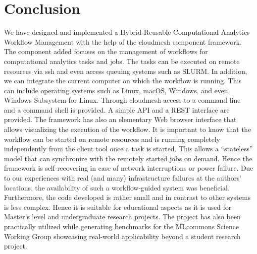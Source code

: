 
\section{Conclusion}

We have designed and implemented a Hybrid Reusable Computational
Analytics Workflow Management with the help of the cloudmesh
component framework. The component added focuses on the management of
workflows for computational analytics tasks and jobs. The tasks can be
executed on remote resources via ssh and even access queuing systems
such as SLURM. In addition, we can integrate the current computer on
which the workflow is running. This can include operating systems such
as Linux, macOS, Windows, and even Windows Subsystem for Linux. Through
cloudmesh access to a command line and a command shell is provided. A
simple API and a REST interface are provided. The framework has also an
elementary Web browser interface that allows visualizing the
execution of the workflow.  It is important to know that the workflow
can be started on remote resources and is running completely
independently from the client tool once a task is started. This allows a
``stateless'' model that can synchronize with the remotely started jobs
on demand. Hence the framework is self-recovering in case of network
interruptions or power failure. Due to our experiences with real (and
many) infrastructure failures at the authors' locations, the
availability of such a workflow-guided system was
beneficial. Furthermore, the code developed is rather small and in
contrast to other systems is less complex. Hence it is suitable for
educational aspects as it is used for Master's level and undergraduate
research projects. The project has also been practically utilized while
generating benchmarks for the MLcommons Science Working Group
showcasing real-world applicability beyond a student research project.
